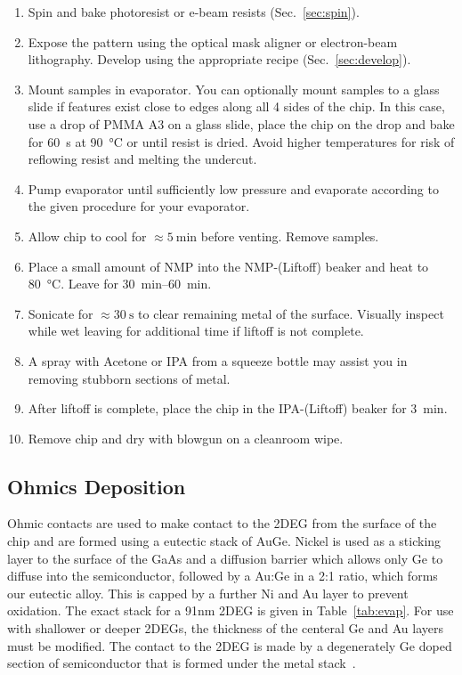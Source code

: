 
\begin{enumerate}
    \item Spin and bake photoresist or e-beam resists (Sec.~\ref{sec:spin}).
    \item Expose the pattern using the optical mask aligner or electron-beam lithography. Develop using the appropriate recipe (Sec.~\ref{sec:develop}).
    \item Mount samples in evaporator. You can optionally mount samples to a glass slide if features exist close to edges along all 4 sides of the chip. In this case, use a drop of PMMA A3 on a glass slide, place the chip on the drop and bake for \SI{60}{\second} at \SI{90}{\celsius} or until resist is dried. Avoid higher temperatures for risk of reflowing resist and melting the undercut.
    \item Pump evaporator until sufficiently low pressure and evaporate according to the given procedure for your evaporator.
    \item Allow chip to cool for $\approx \SI{5}{\minute}$ before venting. Remove samples.
    \item Place a small amount of NMP into the NMP-(Liftoff) beaker and heat to \SI{80}{\celsius}. Leave for \SIrange{30}{60}{\minute}.
    \item Sonicate for $\approx \SI{30}{\second}$ to clear remaining metal of the surface. Visually inspect while wet leaving for additional time if liftoff is not complete.
    \item A spray with Acetone or IPA from a squeeze bottle may assist you in removing stubborn sections of metal.
    \item After liftoff is complete, place the chip in the IPA-(Liftoff) beaker for \SI{3}{\minute}.
    \item Remove chip and dry with  blowgun on a cleanroom wipe.
\end{enumerate}

\subsection{Ohmics Deposition}
\label{sec:ohmics}
Ohmic contacts are used to make contact to the 2DEG from the surface of the chip and are formed using a eutectic stack
of AuGe. Nickel is used as a sticking layer to the surface of the GaAs and a diffusion barrier which allows only Ge to diffuse
into the semiconductor, followed by a Au:Ge in a 2:1 ratio, which forms our eutectic alloy. This is capped by a further Ni and
Au layer to prevent oxidation. The exact stack for a 91nm 2DEG is given in Table~\ref{tab:evap}. For use with shallower or
deeper 2DEGs, the thickness of the centeral Ge and Au layers must be modified. The contact to the 2DEG is made by a degenerately
Ge doped section of semiconductor that is formed under the metal stack~\cite{RELLING1989380,PIOTROWSKA1983179}.

